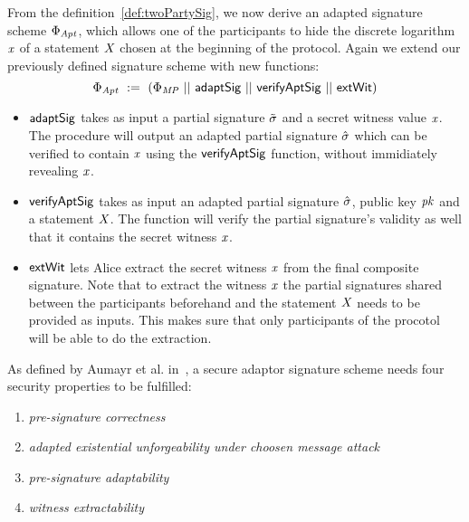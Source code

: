 \begin{definition}
    \label{def:twoPartyFixedWitAptSig}
    From the definition~\ref{def:twoPartySig}, we now derive an adapted signature scheme $\Phi_{\mathit{Apt}}$, which allows one of the participants to hide the discrete logarithm $\mathit{x}$ of a statement $\mathit{X}$ chosen
    at the beginning of the protocol. Again we extend our previously defined signature scheme with new functions:
    \[ \Phi_{\mathit{Apt}} ~:=~ (\Phi_{\mathit{MP}} ~||~ \mathsf{adaptSig} ~||~ \mathsf{verifyAptSig} ~||~ \mathsf{extWit}) \]
    \begin{itemize}
        \item $\mathsf{adaptSig}$ takes as input a partial signature $\tilde{\sigma}$ and a secret witness value $\mathit{x}$. The procedure will output an adapted partial signature $\hat{\sigma}$ which can be verified to contain $\mathit{x}$ using the $\mathsf{verifyAptSig}$ function, without immidiately revealing $\mathit{x}$.
        \item $\mathsf{verifyAptSig}$ takes as input an adapted partial signature $\hat{\sigma}$, public key $\mathit{pk}$ and a statement $\mathit{X}$. The function will verify the partial signature's validity as well that it contains the secret witness $\mathit{x}$.
        \item $\mathsf{extWit}$ lets Alice extract the secret witness $\mathit{x}$ from the final composite signature. Note that to extract the witness $\mathit{x}$ the partial signatures shared between the participants beforehand and the statement $\mathit{X}$ needs to be provided as inputs. This makes sure that only participants of the procotol will be able to do the extraction.
    \end{itemize}
\end{definition}

\begin{definition}
    As defined by Aumayr et al. in~\cite{aumayr2020bitcoinchannels}, a secure adaptor signature scheme needs four security properties to be fulfilled:
    \begin{enumerate}
        \item \textit{pre-signature correctness}
        \item \textit{adapted existential unforgeability under choosen message attack}
        \item \textit{pre-signature adaptability}
        \item \textit{witness extractability}
    \end{enumerate}
\end{definition}

